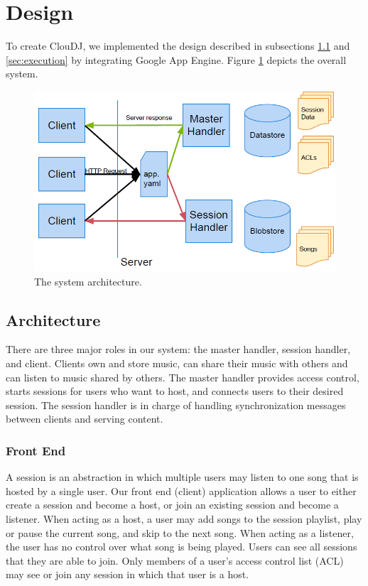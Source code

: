 \section{Design}
\label{sec:design}
To create ClouDJ, we implemented the design described 
in subsections \ref{sec:architecture} and \ref{sec:execution} 
by integrating Google App Engine. 
Figure \ref{fig:arch} depicts the overall system.

\begin{figure}[ht]
\centering
\includegraphics[width=160mm]{architecture.png}
\caption{The system architecture.}
\label{fig:arch}
\end{figure}

\subsection{Architecture}
\label{sec:architecture}
There are three major roles in our system: 
the master handler, session handler, and client. Clients own 
and store music, can share their music with others 
and can listen to music shared by others. The master handler provides 
access control, starts sessions for users who want to host, and
connects users to their desired session. The session 
handler is in charge of handling synchronization messages between clients
and serving content.

\subsubsection{Front End}
\label{sec:frontend}
A session is an abstraction in which multiple users 
may listen to one song that is hosted by a single user. 
Our front end (client) application allows a user to either 
create a session and become a host, or join an existing 
session and become a listener. When acting as a host, 
a user may add songs to the session playlist, 
play or pause the current song, and skip to the next song. 
When acting as a listener, the user has 
no control over what song is being played. Users can 
see all sessions that they are able to join. Only 
members of a user's access control list (ACL) may 
see or join any session in which that user is a host.

